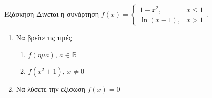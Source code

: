 \documentclass[greek]{beamer}
\begin{document}
\begin{frame}{Εξάσκηση}
 Δίνεται η συνάρτηση $f(x)=\begin{cases}
   1-x^2,     & x\le 1 \\
   \ln (x-1), & x>1
  \end{cases}$.
 \begin{enumerate}
  \item<1-> Να βρείτε τις τιμές
        \begin{enumerate}
         \item<1-> $f(ημ a)$, $a\in\mathbb{R}$
         \item<2-> $f(x^2+1)$, $x\ne 0$
        \end{enumerate}
  \item<2-> Να λύσετε την εξίσωση $f(x)=0$
 \end{enumerate}
\end{frame}
\end{document}
